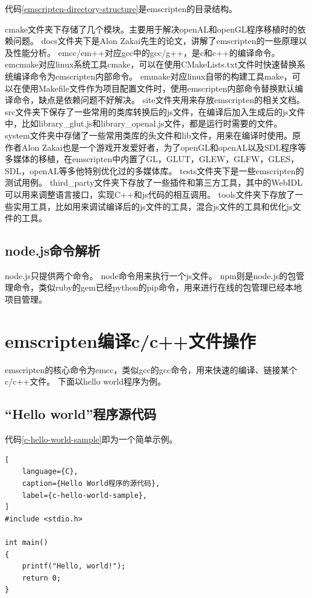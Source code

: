 代码\ref{emscripten-directory-structure}是emscripten的目录结构。

cmake文件夹下存储了几个模块。主要用于解决openAL和openGL程序移植时的依赖问题。
docs文件夹下是Alon Zakai先生的论文，讲解了emscripten的一些原理以及性能分析。
emcc/em++对应gcc中的gcc/g++，是c和c++的编译命令。
emcmake对应linux系统工具cmake，可以在使用CMakeLists.txt文件时快速替换系统编译命令为emscripten内部命令。
emmake对应linux自带的构建工具make，可以在使用Makefile文件作为项目配置文件时，使用emscripten内部命令替换默认编译命令，缺点是依赖问题不好解决。
site文件夹用来存放emscripten的相关文档。
src文件夹下保存了一些常用的类库转换后的js文件，在编译后加入生成后的js文件中，比如library\_glut.js和library\_openal.js文件，都是运行时需要的文件。
system文件夹中存储了一些常用类库的头文件和lib文件，用来在编译时使用。原作者Alon Zakai也是一个游戏开发爱好者，为了openGL和openAL以及SDL程序等多媒体的移植，在emscripten中内置了GL，GLUT，GLEW，GLFW，GLES，SDL，openAL等多他特别优化过的多媒体库。
tests文件夹下是一些emscripten的测试用例。
third\_party文件夹下存放了一些插件和第三方工具，其中的WebIDL可以用来调整语言接口，实现C++和js代码的相互调用。
tools文件夹下存放了一些实用工具，比如用来调试编译后的js文件的工具，混合js文件的工具和优化js文件的工具。


\subsection{node.js命令解析}

node.js只提供两个命令。
node命令用来执行一个js文件。
npm则是node.js的包管理命令，类似ruby的gem已经python的pip命令，用来进行在线的包管理已经本地项目管理。

\section{emscripten编译c/c++文件操作}

emscripten的核心命令为emcc，类似gcc的gcc命令，用来快速的编译、链接某个c/c++文件。
下面以hello world程序为例。

\subsection{“Hello world”程序源代码}

代码\ref{c-hello-world-sample}即为一个简单示例。

\begin{lstlisting}[
    language={C},
    caption={Hello World程序的源代码},
    label={c-hello-world-sample},
]
#include <stdio.h>

int main()
{
    printf("Hello, world!");
    return 0;
}
\end{lstlisting}

